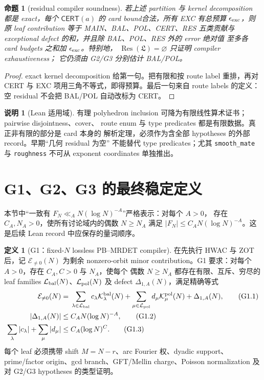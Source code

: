 \documentclass[11pt,a4paper]{ctexart}
\newtheorem{proposition}[theorem]{命题}
\theoremstyle{definition}
\newtheorem{definition}[theorem]{定义}
\newtheorem{remark}[theorem]{说明}
\newcommand{\1}{\mathbf 1}
\newcommand{\E}{\mathcal E}
\newcommand{\K}{\mathcal K}
\newcommand{\LL}{\mathcal L}
\begin{document}
\begin{proposition}[residual compiler soundness]
若上述 partition 与 kernel decomposition 都是 exact，每个
$\mathsf{CERT}(a)$ 的 card bound合法，所有 \textsf{EXC} 有总预算
$\epsilon_{\rm exc}$，则原 leaf contribution 等于 MAIN、BAL、POL、CERT、RES
五类贡献与 exceptional defect 的和，并且除 BAL、POL、RES 外的 error 绝对值
至多各 card budgets 之和加 $\epsilon_{\rm exc}$。特别地，
$\operatorname{Res}(\mathfrak L)=\varnothing$ 只证明 compiler exhaustiveness；
它仍须由 G2/G3 分别估计 BAL/POL。
\end{proposition}

\begin{proof}
exact kernel decomposition 给第一句。把有限和按 route label 重排，再对
\textsf{CERT} 与 \textsf{EXC} 项用三角不等式，即得预算。最后一句来自
route labels 的定义：空 residual 不会把 BAL/POL 自动改标为 CERT。
\end{proof}

\begin{remark}[Lean 适用域]
有理 polyhedron inclusion 可降为有限线性算术证书；pairwise disjointness、cover、
route enum 与 type predicates 都是有限数据。真正非有限的部分是 card 本身的
解析定理，必须作为含全部 hypotheses 的外部 record。早期“几何 residual 为空”
不能替代 type predicates；尤其 \texttt{smooth\_mate} 与 \texttt{roughness}
不可从 exponent coordinates 单独推出。
\end{remark}

\section{G1、G2、G3 的最终稳定定义}

本节中“一致有 $F_N\ll_A N(\log N)^{-A}$”严格表示：对每个 $A>0$，
存在 $C_A,N_A>0$，使所有讨论域内的偶数 $N\ge N_A$ 满足
$|F_N|\le C_A N(\log N)^{-A}$。这是后续 Lean record 中应保存的量词顺序。

\begin{definition}[G1：fixed-$N$ lossless PB--MRDET compiler]
在先执行 HWAC 与 ZOT 后，记 $\E_{\ne0}(N)$ 为剩余 nonzero-orbit minor
contribution。G1 要求：对每个 $A>0$，存在 $C_A,C>0$ 与 $N_A$，使每个
偶数 $N\ge N_A$ 都存在有限、互斥、穷尽的 leaf families
$\LL_{\rm bal}(N)$、$\LL_{\rm pol}(N)$ 及 defect $\Delta_{1,A}(N)$，满足精确等式
\begin{align}
\E_{\ne0}(N)
={}&\sum_{\lambda\in\LL_{\rm bal}}c_\lambda
\K_\lambda^{\rm bal}(N)
+\sum_{\mu\in\LL_{\rm pol}}d_\mu
\K_\mu^{\rm pol}(N)+\Delta_{1,A}(N),                 \tag{G1.1}\\
|\Delta_{1,A}(N)|\le{}&C_A N(\log N)^{-A},           \tag{G1.2}\\
\sum_\lambda|c_\lambda|+
\sum_\mu|d_\mu|\le{}&C_A(\log N)^C.                 \tag{G1.3}
\end{align}
每个 leaf 必须携带 shift $M=N-r$、arc Fourier 权、dyadic support、
prime/factor origin、gcd branch、GFT/Mellin charge、Poisson normalization
及对 G2/G3 hypotheses 的类型证明。
\end{definition}
\end{document}
